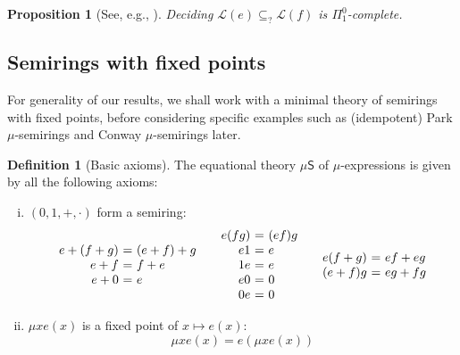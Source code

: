 \documentclass[a4paper,10pt]{amsart}
\newcommand{\defname}[1]{\textbf{{#1}}}
\newtheorem{proposition}[theorem]{Proposition}
\theoremstyle{definition}
\newtheorem{definition}[theorem]{Definition}
\newcommand{\Lang}{\mathcal L}
\newcommand{\lang}[1]{\Lang(#1)}
\newcommand{\basicax}{\mu\mathsf{S}}
\begin{document}
\begin{proposition}
[See, e.g., \cite{HopcroftUllman79:book,Sipser96:book}]
    Deciding $\lang e \subseteq_? \lang f$ is $\Pi^0_1$-complete.
\end{proposition}

\subsection{Semirings with fixed points}
For generality of our results, we shall work with a minimal theory of semirings with fixed points, before considering specific examples such as (idempotent) Park $\mu$-semirings and Conway $\mu$-semirings later.

\begin{definition}
[Basic axioms]
    The equational theory $\basicax$ of $\mu$-expressions is given by all the following axioms:
    \begin{enumerate}[(i)]
    \item $(0,1,+,\cdot) $ form a semiring:
    \[
    \begin{array}{r@{\ = \ }l}
         e + (f+g) & (e+f)+g \\
         e+f & f + e\\
         e+0 & e 
    \end{array}
    \quad
    \begin{array}{r@{\ = \ }l}
         e (fg) & (ef)g \\
         e1 & e \\
         1 e & e \\
         e0 & 0 \\
         0e & 0
    \end{array}
    \quad
    \begin{array}{r@{\ = \ }l}
         e(f+g) & ef + eg \\
         (e+f)g & eg + fg
    \end{array}
    \]
    \item\label{item:fixed-point-axioms} $\mu x e(x)$ is a fixed point of $ x \mapsto e(x)$:
    \[
    \mu x e(x) = e (\mu x e(x))
    \]
    \end{enumerate}
\end{definition}
\end{document}
